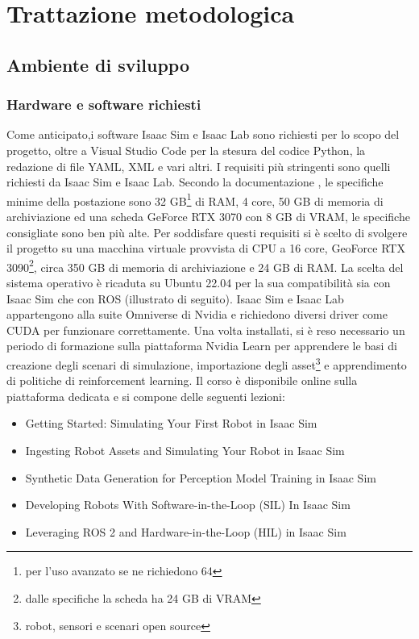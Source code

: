 \section{Trattazione metodologica}

\subsection{Ambiente di sviluppo}

\subsubsection{Hardware e software richiesti}
Come anticipato,i software Isaac Sim e Isaac Lab sono richiesti per lo scopo del progetto, oltre a Visual Studio Code per la stesura del codice Python, la redazione di file YAML, XML e vari altri. I requisiti più stringenti sono quelli richiesti da Isaac Sim e Isaac Lab. Secondo la documentazione \cite{nvidiaIsaacSim2025}, le specifiche minime della postazione sono 32 GB\footnote{per l'uso avanzato se ne richiedono 64} di RAM, 4 core, 50 GB di memoria di archiviazione ed una scheda GeForce RTX 3070 con 8 GB di VRAM, le specifiche consigliate sono ben più alte. Per soddisfare questi requisiti si è scelto di svolgere il progetto su una macchina virtuale provvista di CPU a 16 core, GeoForce RTX 3090\footnote{dalle specifiche la scheda ha 24 GB di VRAM}, circa 350 GB di memoria di archiviazione e 24 GB di RAM. La scelta del sistema operativo è ricaduta su Ubuntu 22.04 per la  sua compatibilità sia con Isaac Sim che con ROS (illustrato di seguito). Isaac Sim e Isaac Lab appartengono alla suite Omniverse di Nvidia e richiedono diversi driver come CUDA per funzionare correttamente. Una volta installati, si è reso necessario un periodo di formazione sulla piattaforma Nvidia Learn per apprendere le basi di creazione degli scenari di simulazione, importazione degli asset\footnote{robot, sensori e scenari open source} e apprendimento di politiche di reinforcement learning. Il corso è disponibile online sulla piattaforma dedicata e si compone delle seguenti lezioni:
\begin{itemize}
    \item Getting Started: Simulating Your First Robot in Isaac Sim
    \item Ingesting Robot Assets and Simulating Your Robot in Isaac Sim
    \item Synthetic Data Generation for Perception Model Training in Isaac Sim
    \item Developing Robots With Software-in-the-Loop (SIL) In Isaac Sim
    \item Leveraging ROS 2 and Hardware-in-the-Loop (HIL) in Isaac Sim
\end{itemize}
